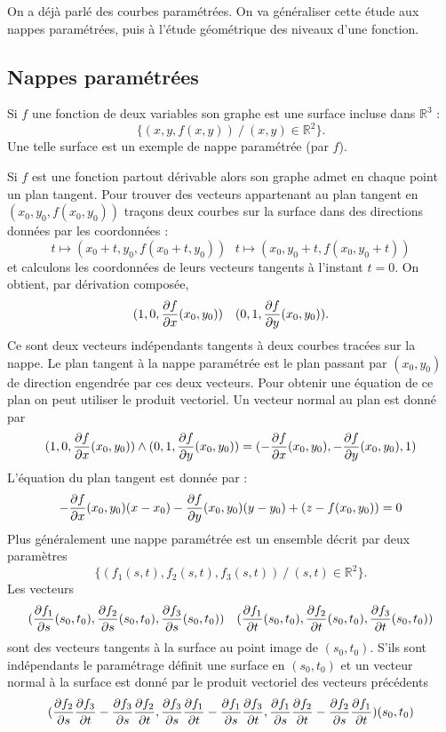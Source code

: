 \documentclass[class=report,crop=false]{standalone}
\begin{document}
{{{{{{On a déj\`a parlé des courbes paramétrées. On va généraliser cette étude aux nappes paramétrées, puis \`a l'étude géométrique des niveaux d'une fonction.


\subsection{Nappes paramétrées}
Si $f$ une fonction de deux variables son graphe est une surface incluse dans $\mathbb{R}^3$ :
$$
\{(x,y,f(x,y))\ / \ (x,y)\in \mathbb{R}^2\}.
$$
Une telle surface est un exemple de nappe paramétrée (par $f$).

Si $f$ est une fonction partout dérivable alors son graphe admet en chaque point un plan tangent. Pour trouver des vecteurs appartenant au plan tangent en $(x_0,y_0,f(x_0,y_0))$ tra\c cons deux courbes sur la surface dans des directions données par les coordonnées :
$$
t\mapsto (x_0+t,y_0,f(x_0+t,y_0))\ \ \ t\mapsto (x_0,y_0+t,f(x_0,y_0+t))
$$
et calculons les coordonnées de leurs vecteurs tangents \`a l'instant $t=0$. On obtient, par dérivation composée,
$$
(1,0,{{\partial f}\over{\partial x}}(x_0,y_0))\ \ \ (0,1,{{\partial f}\over{\partial y}}(x_0,y_0)).
$$
Ce sont deux vecteurs indépendants tangents \`a deux courbes tracées sur la nappe. Le plan tangent \`a la nappe paramétrée est le plan passant par $(x_0,y_0)$ de direction engendrée par ces deux vecteurs. Pour obtenir une équation de ce plan on peut utiliser le produit vectoriel. Un vecteur normal au plan est donné par
$$
(1,0,{{\partial f}\over{\partial x}}(x_0,y_0))\land (0,1,{{\partial f}\over{\partial y}}(x_0,y_0))=(-{{\partial f}\over{\partial x}}(x_0,y_0),-{{\partial f}\over{\partial y}}(x_0,y_0),1)
$$
L'équation du plan tangent est donnée par :
$$
-{{\partial f}\over{\partial x}}(x_0,y_0)(x-x_0)-{{\partial f}\over{\partial y}}(x_0,y_0)(y-y_0)+(z-f(x_0,y_0))=0
$$
Plus généralement une nappe paramétrée est un ensemble décrit par deux param\`etres
$$
\{(f_1(s,t),f_ 2(s,t),f_3(s,t))\ / \ (s,t)\in \mathbb{R}^2\}.
$$
Les vecteurs 
$$
({{\partial f_1}\over{\partial s}}(s_0,t_0),{{\partial f_2}\over{\partial s}}(s_0,t_0),{{\partial f_3}\over{\partial s}}(s_0,t_0))\ \ \ ({{\partial f_1}\over{\partial t}}(s_0,t_0),{{\partial f_2}\over{\partial t}}(s_0,t_0),{{\partial f_3}\over{\partial t}}(s_0,t_0))
$$
sont des vecteurs tangents \`a la surface au point image de $(s_0,t_0)$. S'ils sont indépendants le paramétrage définit une surface en $(s_0,t_0)$ et un vecteur normal \`a la surface est donné par le produit vectoriel des vecteurs précédents
$$
({{\partial f_2}\over{\partial s}}{{\partial f_3}\over{\partial t}}-{{\partial f_3}\over{\partial s}}{{\partial f_2}\over{\partial t}},{{\partial f_3}\over{\partial s}}{{\partial f_1}\over{\partial t}}-{{\partial f_1}\over{\partial s}}{{\partial f_3}\over{\partial t}},{{\partial f_1}\over{\partial s}}{{\partial f_2}\over{\partial t}}-{{\partial f_2}\over{\partial s}}{{\partial f_1}\over{\partial t}})(s_0,t_0)
$$}}}}}}
\end{document}

